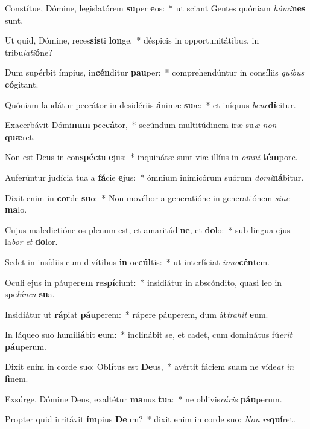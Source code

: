 \item Constítue, Dómine, legislatórem \textbf{su}per \textbf{e}os:~* ut sciant Gentes quóniam \textit{hó}\textit{mi}\textbf{nes} sunt.
\item Ut quid, Dómine, reces\textbf{sís}ti \textbf{lon}ge,~* déspicis in opportunitátibus, in tribu\textit{la}\textit{ti}\textbf{ó}ne?
\item Dum supérbit ímpius, in\textbf{cén}ditur \textbf{pau}per:~* comprehendúntur in consíliis \textit{qui}\textit{bus} \textbf{có}gitant.
\item Quóniam laudátur peccátor in desidériis \textbf{á}nimæ \textbf{su}æ:~* et iníquus \textit{be}\textit{ne}\textbf{dí}citur.
\item Exacerbávit Dómi\textbf{num} pec\textbf{cá}tor,~* secúndum multitúdinem iræ su\textit{æ} \textit{non} \textbf{quæ}ret.
\item Non est Deus in con\textbf{spéc}tu \textbf{e}jus:~* inquinátæ sunt viæ illíus in \textit{om}\textit{ni} \textbf{tém}pore.
\item Auferúntur judícia tua a \textbf{fá}cie \textbf{e}jus:~* ómnium inimicórum suórum \textit{do}\textit{mi}\textbf{ná}bitur.
\item Dixit enim in \textbf{cor}de \textbf{su}o:~* Non movébor a generatióne in generatiónem \textit{si}\textit{ne} \textbf{ma}lo.
\item Cujus maledictióne os plenum est, et amaritúdi\textbf{ne}, et \textbf{do}lo:~* sub lingua ejus la\textit{bor} \textit{et} \textbf{do}lor.
\item Sedet in insídiis cum divítibus \textbf{in} oc\textbf{cúl}tis:~* ut interfíciat \textit{in}\textit{no}\textbf{cén}tem.
\item Oculi ejus in páupe\textbf{rem} re\textbf{spí}ciunt:~* insidiátur in abscóndito, quasi leo in spe\textit{lún}\textit{ca} \textbf{su}a.
\item Insidiátur ut \textbf{rá}piat \textbf{páu}perem:~* rápere páuperem, dum át\textit{tra}\textit{hit} \textbf{e}um.
\item In láqueo suo humili\textbf{á}bit \textbf{e}um:~* inclinábit se, et cadet, cum dominátus fú\textit{e}\textit{rit} \textbf{páu}perum.
\item Dixit enim in corde suo: Ob\textbf{lí}tus est \textbf{De}us,~* avértit fáciem suam ne víde\textit{at} \textit{in} \textbf{fi}nem.
\item Exsúrge, Dómine Deus, exaltétur \textbf{ma}nus \textbf{tu}a:~* ne oblivis\textit{cá}\textit{ris} \textbf{páu}perum.
\item Propter quid irritávit \textbf{ím}pius \textbf{De}um?~* dixit enim in corde suo: \textit{Non} \textit{re}\textbf{quí}ret.
